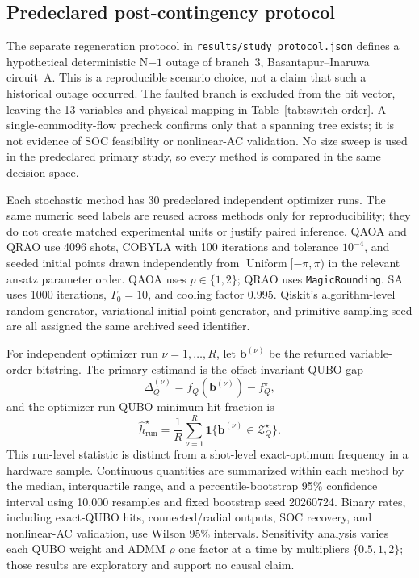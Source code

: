 \documentclass[5p,twocolumn,number,sort&compress,nopreprintline]{elsarticle}
\newcommand{\code}[1]{\texttt{\small #1}}
\begin{document}



\subsection{Predeclared post-contingency protocol}
The separate regeneration protocol in
\code{results/study\_protocol.json} defines a hypothetical deterministic
N$-1$ outage of branch~3, Basantapur--Inaruwa circuit~A. This is a
reproducible scenario choice, not a claim that such a historical outage
occurred. The faulted branch is excluded from the bit vector, leaving the
13 variables and physical mapping in Table~\ref{tab:switch-order}. A
single-commodity-flow precheck confirms only that a spanning tree exists;
it is not evidence of SOC feasibility or nonlinear-AC validation. No size sweep is
used in the predeclared primary study, so every method is compared in the
same decision space.

Each stochastic method has 30 predeclared independent optimizer runs.
The same numeric seed labels are reused across methods only for
reproducibility; they do not create matched experimental units or
justify paired inference. QAOA and
QRAO use 4096 shots, COBYLA with 100 iterations and tolerance $10^{-4}$,
and seeded initial points drawn independently from
$\operatorname{Uniform}[-\pi,\pi)$ in the relevant ansatz parameter
order. QAOA uses $p\in\{1,2\}$; QRAO uses
\texttt{MagicRounding}. SA uses 1000 iterations, $T_0=10$, and cooling
factor $0.995$. Qiskit's algorithm-level random generator, variational
initial-point generator, and primitive sampling seed are all assigned the
same archived seed identifier.

For independent optimizer run $\nu=1,\ldots,R$, let
$\boldsymbol b^{(\nu)}$ be the returned variable-order bitstring. The
primary estimand is the offset-invariant QUBO gap
\begin{equation}
\Delta_Q^{(\nu)}=f_Q(\boldsymbol b^{(\nu)})-f_Q^\star,
\end{equation}
and the optimizer-run QUBO-minimum hit fraction is
\begin{equation}
\widehat h_{\mathrm{run}}^\star=\frac{1}{R}\sum_{\nu=1}^{R}
\mathbf 1\{\boldsymbol b^{(\nu)}\in\mathcal Z_Q^\star\}.
\end{equation}
This run-level statistic is distinct from a shot-level exact-optimum
frequency in a hardware sample.
Continuous quantities are summarized within each method by the
median, interquartile range, and a percentile-bootstrap 95\% confidence
interval using 10,000 resamples and fixed bootstrap seed 20260724.
Binary rates, including exact-QUBO hits, connected/radial outputs,
SOC recovery, and nonlinear-AC validation, use Wilson 95\% intervals.
Sensitivity analysis varies each QUBO weight
and ADMM $\rho$ one factor at a time by multipliers
$\{0.5,1,2\}$; those results are exploratory and support no causal claim.
\end{document}
